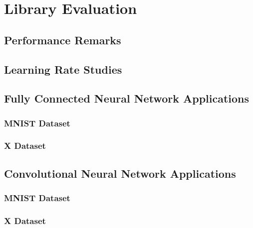 \chapter{Library Evaluation}


\section{Performance Remarks}


\section{Learning Rate Studies}


\section{Fully Connected Neural Network Applications}

\subsection{MNIST Dataset}

\subsection{X Dataset}


\section{Convolutional Neural Network Applications}

\subsection{MNIST Dataset}

\subsection{X Dataset}